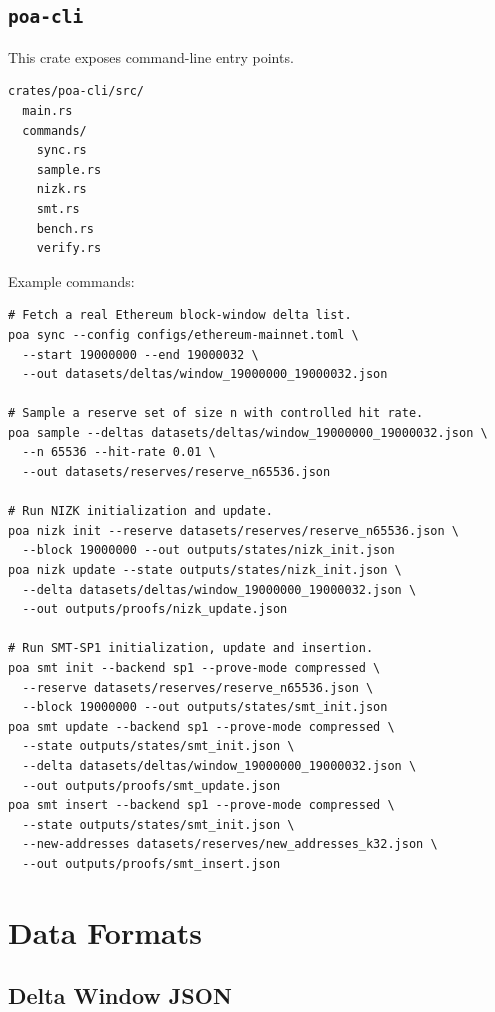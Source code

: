 \documentclass[UTF8,a4paper,11pt]{ctexart}
\begin{document}
\subsection{\texttt{poa-cli}}

This crate exposes command-line entry points.

\begin{lstlisting}
crates/poa-cli/src/
  main.rs
  commands/
    sync.rs
    sample.rs
    nizk.rs
    smt.rs
    bench.rs
    verify.rs
\end{lstlisting}

Example commands:
\begin{lstlisting}
# Fetch a real Ethereum block-window delta list.
poa sync --config configs/ethereum-mainnet.toml \
  --start 19000000 --end 19000032 \
  --out datasets/deltas/window_19000000_19000032.json

# Sample a reserve set of size n with controlled hit rate.
poa sample --deltas datasets/deltas/window_19000000_19000032.json \
  --n 65536 --hit-rate 0.01 \
  --out datasets/reserves/reserve_n65536.json

# Run NIZK initialization and update.
poa nizk init --reserve datasets/reserves/reserve_n65536.json \
  --block 19000000 --out outputs/states/nizk_init.json
poa nizk update --state outputs/states/nizk_init.json \
  --delta datasets/deltas/window_19000000_19000032.json \
  --out outputs/proofs/nizk_update.json

# Run SMT-SP1 initialization, update and insertion.
poa smt init --backend sp1 --prove-mode compressed \
  --reserve datasets/reserves/reserve_n65536.json \
  --block 19000000 --out outputs/states/smt_init.json
poa smt update --backend sp1 --prove-mode compressed \
  --state outputs/states/smt_init.json \
  --delta datasets/deltas/window_19000000_19000032.json \
  --out outputs/proofs/smt_update.json
poa smt insert --backend sp1 --prove-mode compressed \
  --state outputs/states/smt_init.json \
  --new-addresses datasets/reserves/new_addresses_k32.json \
  --out outputs/proofs/smt_insert.json
\end{lstlisting}

\section{Data Formats}

\subsection{Delta Window JSON}
\end{document}
